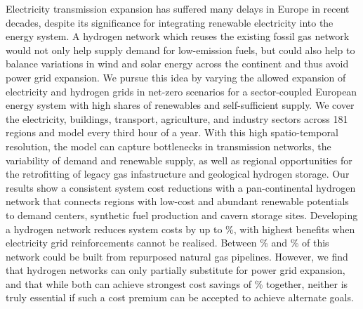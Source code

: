 Electricity transmission expansion has suffered many delays in Europe in recent
decades, despite its significance for integrating renewable electricity into the
energy system. A hydrogen network which reuses the existing fossil gas network
would not only help supply demand for low-emission fuels, but could also help to
balance variations in wind and solar energy across the continent and thus avoid
power grid expansion. We pursue this idea by varying the allowed expansion of
electricity and hydrogen grids in net-zero \co scenarios for a sector-coupled
European energy system with high shares of renewables and self-sufficient
supply. We cover the electricity, buildings, transport, agriculture, and
industry sectors across 181 regions and model every third hour of a year. With
this high spatio-temporal resolution, the model can capture bottlenecks in
transmission networks, the variability of demand and renewable supply, as well
as regional opportunities for the retrofitting of legacy gas infastructure and
geological hydrogen storage. Our results show a consistent system cost
reductions with a pan-continental hydrogen network that connects regions with
low-cost and abundant renewable potentials to demand centers, synthetic fuel
production and cavern storage sites. Developing a hydrogen network reduces
system costs by up to \maxhybenefitrel\%, with highest benefits when electricity
grid reinforcements cannot be realised. Between \minretroshare\% and
\maxretroshare\% of this network could be built from repurposed natural gas
pipelines. However, we find that hydrogen networks can only partially substitute
for power grid expansion, and that while both can achieve strongest cost savings
of \gridbenefitrel\% together, neither is truly essential if such a cost premium can
be accepted to achieve alternate goals.


